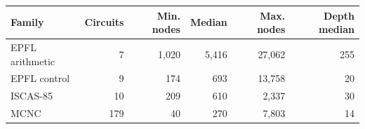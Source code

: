 \begin{tabular}{@{}lrrrrr@{}}
\toprule
\textbf{Family} & \textbf{Circuits} & \textbf{Min. nodes} & \textbf{Median} & \textbf{Max. nodes} & \textbf{Depth median} \\
\midrule
EPFL arithmetic & 7 & 1,020 & 5,416 & 27,062 & 255 \\
EPFL control & 9 & 174 & 693 & 13,758 & 20 \\
ISCAS-85 & 10 & 209 & 610 & 2,337 & 30 \\
MCNC & 179 & 40 & 270 & 7,803 & 14 \\
\bottomrule
\end{tabular}
